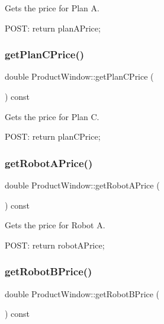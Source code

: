 Gets the price for Plan A. 

P\+O\+ST\+: return plan\+A\+Price; \mbox{\label{class_product_window_a6236c105e5feffeb6bc778ea7f936939}} 
\subsubsection{\texorpdfstring{getPlanCPrice()}{getPlanCPrice()}}
{\footnotesize\ttfamily double Product\+Window\+::get\+Plan\+C\+Price (\begin{DoxyParamCaption}{ }\end{DoxyParamCaption}) const}



Gets the price for Plan C. 

P\+O\+ST\+: return plan\+C\+Price; \mbox{\label{class_product_window_a2256cbdf9844bb57ac003fcb719cabbb}} 
\subsubsection{\texorpdfstring{getRobotAPrice()}{getRobotAPrice()}}
{\footnotesize\ttfamily double Product\+Window\+::get\+Robot\+A\+Price (\begin{DoxyParamCaption}{ }\end{DoxyParamCaption}) const}



Gets the price for Robot A. 

P\+O\+ST\+: return robot\+A\+Price; \mbox{\label{class_product_window_a4017b51e048ec4e725af49dc0dfb5c2b}} 
\subsubsection{\texorpdfstring{getRobotBPrice()}{getRobotBPrice()}}
{\footnotesize\ttfamily double Product\+Window\+::get\+Robot\+B\+Price (\begin{DoxyParamCaption}{ }\end{DoxyParamCaption}) const}



